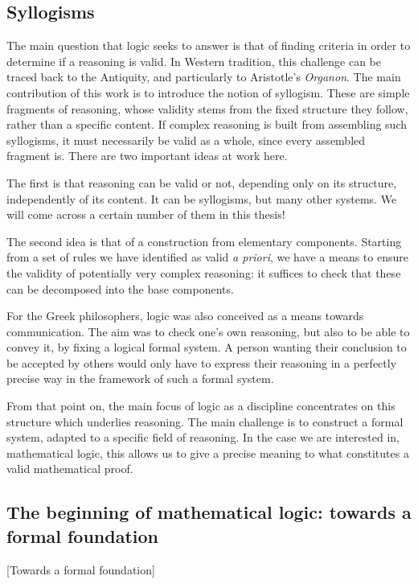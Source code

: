 \subsection{Syllogisms}

The main question that logic seeks to answer is that of finding criteria in order to determine
if a reasoning is valid. In Western tradition, this challenge can be traced back to the
Antiquity, and particularly to Aristotle's \textit{Organon}.
The main contribution of this work is to introduce the notion of syllogism.
These are simple fragments of reasoning, whose validity stems from the
fixed structure they follow, rather than a specific content.%
If complex reasoning is built from assembling such syllogisms, it must necessarily be valid as
a whole, since every assembled fragment is. There are two important ideas at work here.

The first is that reasoning can be valid or not, depending only on its structure,
independently of its content.
It can be syllogisms, but many other systems. We will come across a certain number of them
in this thesis!

The second idea is that of a construction from elementary components.
Starting from a set of rules
we have identified as valid \textit{a priori}, we have a means to ensure the validity
of potentially very complex reasoning: it suffices to check that these
can be decomposed into the base components.

For the Greek philosophers, logic was also conceived as a means towards communication.
The aim was to check one’s own reasoning, but also to be able to convey
it, by fixing a logical formal system.%
A person wanting their conclusion to be accepted by others would only have to express their
reasoning in a perfectly precise way in the framework of such a formal system.

From that point on, the main focus of logic as a discipline
concentrates on this structure which underlies reasoning.
The main challenge is to construct a formal system, adapted to a specific
field of reasoning. In the case we are interested in, mathematical logic, this
allows us to give a precise meaning to what constitutes a valid mathematical proof.


\subsection{The beginning of mathematical logic: towards a formal foundation}[Towards a formal foundation]

